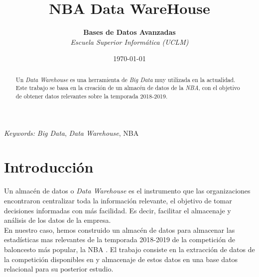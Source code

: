 \documentclass[11pt]{diazessay} %
\title{\textbf{NBA Data WareHouse}} %
\author{\textbf{Bases de Datos Avanzadas} \\ \textit{Escuela Superior Informática (UCLM)}} %
\date{\today} %
\begin{document}
\maketitle %



\begin{abstract}
	
	Un \textit{Data Warehouse} es una herramienta de \textit{Big Data} muy utilizada en la actualidad. Este trabajo se basa en la creación de un almacén de datos de la \textit{NBA}, con el objetivo de obtener datos relevantes sobre la temporada 2018-2019.

\end{abstract}

\hspace*{3.6mm}\textit{Keywords:} \textit{Big Data}, \textit{Data Warehouse}, NBA

\vspace{20pt} %


\section*{Introducción}
Un almacén de datos o \textit{Data Warehouse} es el instrumento que las organizaciones encontraron centralizar toda la información relevante, el objetivo de tomar decisiones informadas con más facilidad. Es decir, facilitar el almacenaje y análisis de los datos de la empresa.\\

En nuestro caso, hemos construido un almacén de datos para almacenar las estadísticas mas relevantes de la temporada 2018-2019 de la competición de baloncesto más popular, la NBA \cite{nba}. El trabajo consiste en la extracción de datos de la competición disponibles en \cite{basket_ref} y almacenaje de estos datos en una base datos relacional para su posterior estudio.\\
\end{document}
